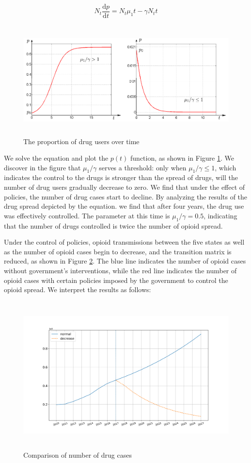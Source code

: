 \documentclass[13pt]{ctexart}
\begin{document}
\begin{equation}
	N_t\frac{\mathrm{d}p}{\mathrm{d}t}=N_t\mu_1t-\gamma N_t t
\end{equation}

\begin {figure}[h]
	\centering %
	\includegraphics[width=15cm,height=6cm]{5.png}
	\caption{The proportion of drug users over time} %
	\label{SIS}
\end {figure}

We solve the equation and plot the $p(t)$ function, as shown in Figure \ref{SIS}. We discover in the figure that $\mu_1 / \gamma $ serves a threshold: only when $\mu_1 / \gamma \leq 1$, which indicates the control to the drugs is stronger than the spread of drugs, will the number of drug users gradually decrease to zero. We find that under the effect of policies, the number of drug cases start to decline. By analyzing the results of the drug spread depicted by the equation. we find that after four years, the drug use was effectively controlled. The parameter at this time is $\mu_1 / \gamma = 0.5$, indicating that the number of drugs controlled is twice the number of opioid spread.

Under the control of policies, opioid transmissions between the five states as well as the number of opioid cases begin to decrease, and the transition matrix is reduced, as shown in Figure \ref{trans_adjust}. The blue line indicates the number of opioid cases without government's interventions, while the red line indicates the number of opioid cases with certain policies imposed by the government to control the opioid spread. We interpret the results as follows:
\begin {figure}[h]
	\centering %
	\includegraphics[width=16cm,height=8cm]{6.png}
	\caption{Comparison of number of drug cases} %
	\label{trans_adjust}
\end {figure}
\end{document}
